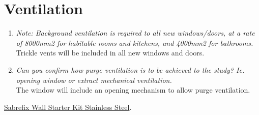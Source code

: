 \documentclass{extension}
\begin{document}
\section{Ventilation}
\begin{enumerate}
\item {\it Note: Background ventilation is required to all new windows/doors, at a rate of 8000mm2 for habitable rooms and kitchens, and 4000mm2 for bathrooms.}\\
Trickle vents will be included in all new windows and doors.
\item {\it Can you confirm how purge ventilation is to be achieved to the study? Ie. opening window or extract mechanical ventilation.}\\
The window will include an opening mechanism to allow purge ventilation.
\end{enumerate}

\begin{thebibliography}{9}
 \href{https://www.screwfix.com/p/sabrefix-wall-starter-kit-stainless-steel/56037?kpid=56037&cm_mmc=Google-_-Datafeed-_-Building%20and%20Doors?kpid=KINASEKPID&cm_mmc=Google-_-TOKEN1-_-TOKEN2&gclid=EAIaIQobChMIvrnvoZmQgQMVjIFQBh3P7gMrEAQYAiABEgIWrvD_BwE&gclsrc=aw.ds}{Sabrefix Wall Starter Kit Stainless Steel}.



\end{thebibliography}
\end{document}
